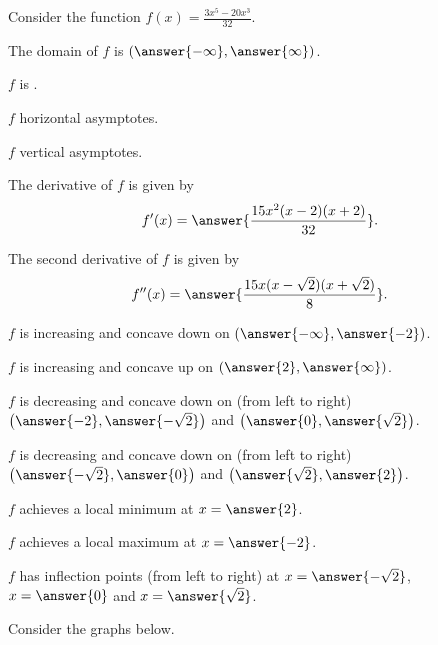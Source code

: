 \documentclass{ximera}
\author{Nela Lakos \and Kyle Parsons}
\begin{document}
\begin{exercise}

Consider the function $f(x) = \frac{3x^5-20x^3}{32}$.

The domain of $f$ is $\left(\answer{-\infty},\answer{\infty}\right)$.

$f$ is .

$f$  horizontal asymptotes.

$f$  vertical asymptotes.

The derivative of $f$ is given by
\[
f'(x) = \answer{\frac{15x^2(x-2)(x+2)}{32}}.
\]

The second derivative of $f$ is given by 
\[
f''(x) = \answer{\frac{15x(x-\sqrt{2})(x+\sqrt{2})}{8}}.
\]

$f$ is increasing and concave down on $\left(\answer{-\infty},\answer{-2}\right)$.

$f$ is increasing and concave up on $\left(\answer{2},\answer{\infty}\right)$.

$f$ is decreasing and concave down on (from left to right) $\left(\answer{-2},\answer{-\sqrt{2}}\right)$ and $\left(\answer{0},\answer{\sqrt{2}}\right)$.

$f$ is decreasing and concave down on (from left to right) $\left(\answer{-\sqrt{2}},\answer{0}\right)$ and $\left(\answer{\sqrt{2}},\answer{2}\right)$.

$f$ achieves a local minimum at $x=\answer{2}$.

$f$ achieves a local maximum at $x=\answer{-2}$.

$f$ has inflection points (from left to right) at $x=\answer{-\sqrt{2}}$, $x=\answer{0}$ and $x=\answer{\sqrt{2}}$.

Consider the graphs below.

\end{exercise}
\end{document}
